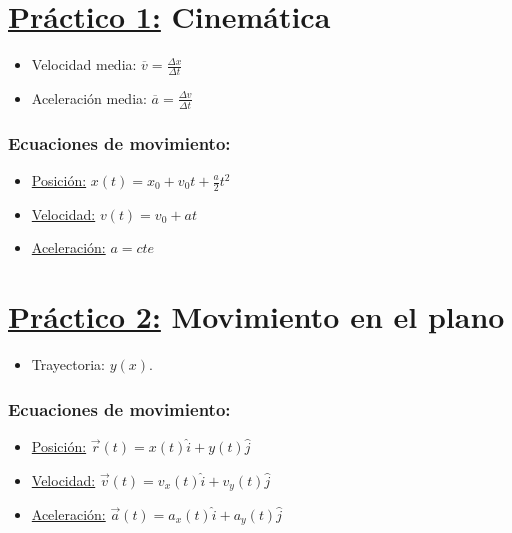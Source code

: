 \documentclass[12pt,a4paper]{article}
\begin{document}
	\section*{\underline{Práctico 1:} Cinemática}
		\begin{multicols}{2}
			\begin{itemize}
				\item Velocidad media: $\overline{v} = \frac{\Delta x}{\Delta t}$
				\item Aceleración media: $\overline{a} = \frac{\Delta v}{\Delta t}$
			\end{itemize}
		\end{multicols}

		\subsubsection*{Ecuaciones de movimiento:}
			\begin{multicols}{3}
				\begin{itemize}
					\item \underline{Posición:} $x(t) = x_{0} + v_{0} t + \frac{a}{2} t^{2}$
					\item \underline{Velocidad:} $v(t) = v_{0} + at$
					\item \underline{Aceleración:} $a = cte$
				\end{itemize}
			\end{multicols}

	\section*{\underline{Práctico 2:} Movimiento en el plano}
		\begin{itemize}
			\item Trayectoria: $y(x)$.
		\end{itemize}

		\subsubsection*{Ecuaciones de movimiento:}
			\begin{itemize}
				\item \underline{Posición:} $\vec{r}(t) = x(t) \hat{i} + y(t) \hat{j}$
				\item \underline{Velocidad:} $\vec{v}(t) = v_{x}(t) \hat{i} + v_{y}(t) \hat{j}$
				\item \underline{Aceleración:} $\vec{a}(t) = a_{x}(t) \hat{i} + a_{y}(t) \hat{j}$
			\end{itemize}
\end{document}
